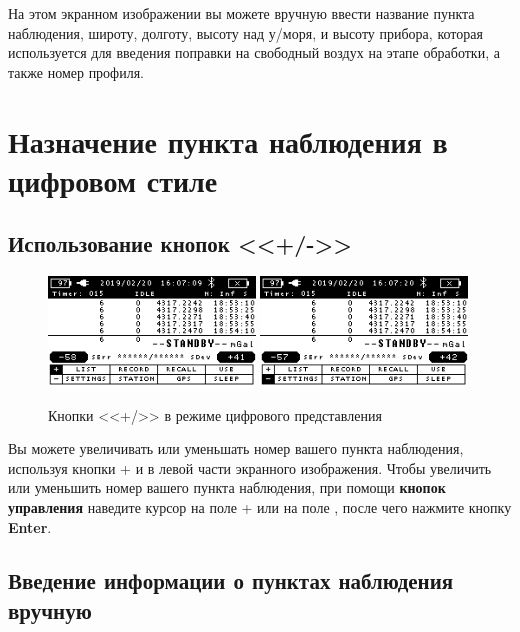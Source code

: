 На этом экранном изображении вы можете вручную ввести название пункта
наблюдения, широту, долготу, высоту над у/моря, и высоту прибора, которая
используется для введения поправки на свободный воздух на этапе обработки, а
также номер профиля.

\section[Назначение пункта]{Назначение пункта наблюдения в цифровом стиле}


\subsection{Использование кнопок <<+/->>}

\begin{figure}[h]
  \centering
  \includegraphics[width=0.49\textwidth]{figures/+_-_buttons_in_numeric_mode_1}
  \includegraphics[width=0.49\textwidth]{figures/+_-_buttons_in_numeric_mode_2}
  \caption{Кнопки <<+/\textminus{}>> в режиме цифрового представления}
  \label{fig:+_-_buttons_in_numeric_mode}
\end{figure}

Вы можете увеличивать или уменьшать номер вашего пункта наблюдения, используя
кнопки + и \textminus{} в левой части экранного изображения. Чтобы увеличить или
уменьшить номер вашего пункта наблюдения, при помощи \textbf{кнопок управления}
наведите курсор на поле + или на поле \textminus{}, после чего нажмите кнопку
\textbf{Enter}.

\subsection{Введение информации о пунктах наблюдения вручную}

